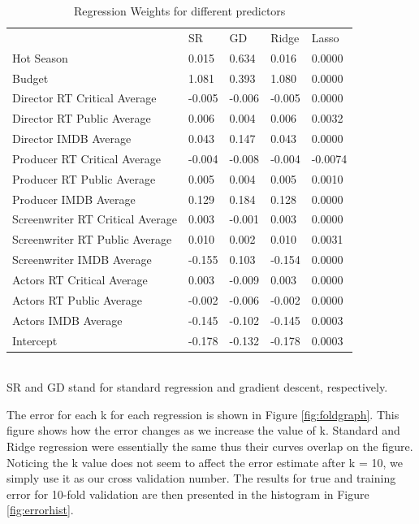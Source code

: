\documentclass[conference]{IEEEtran}
\begin{document}
\begin{table}[h]
\caption{Regression Weights for different predictors}
\label{table:regweights}
\begin{tabular}{lllll}
                                 &SR       & GD & Ridge  & Lasso\\
Hot Season                       & 0.015        & 0.634            & 0.016  & 0.0000  \\
Budget                           & 1.081        & 0.393            & 1.080  & 0.0000  \\
Director RT Critical Average     & -0.005       & -0.006           & -0.005 & 0.0000  \\
Director RT Public Average       & 0.006        & 0.004            & 0.006  & 0.0032  \\
Director IMDB Average            & 0.043        & 0.147            & 0.043  & 0.0000  \\
Producer RT Critical Average     & -0.004       & -0.008           & -0.004 & -0.0074 \\
Producer RT Public Average       & 0.005        & 0.004            & 0.005  & 0.0010  \\
Producer IMDB Average            & 0.129        & 0.184            & 0.128  & 0.0000  \\
Screenwriter RT Critical Average & 0.003        & -0.001           & 0.003  & 0.0000  \\
Screenwriter RT Public Average   & 0.010        & 0.002            & 0.010  & 0.0031  \\
Screenwriter IMDB Average        & -0.155       & 0.103            & -0.154 & 0.0000  \\
Actors RT Critical Average       & 0.003        & -0.009           & 0.003  & 0.0000  \\
Actors RT Public Average         & -0.002       & -0.006           & -0.002 & 0.0000  \\
Actors IMDB Average              & -0.145       & -0.102           & -0.145 & 0.0003  \\
Intercept                        & -0.178       & -0.132           & -0.178 & 0.0003 
\end{tabular}
\\
SR and GD stand for standard regression and gradient descent, respectively.
\end{table}

The error for each k for each regression is shown in Figure \ref{fig:foldgraph}. This figure shows how
the error changes as we increase the value of k. Standard and Ridge regression were essentially the same 
thus their curves overlap on the figure. Noticing the k value does 
not seem to affect the error estimate after k = 10, we simply use it as our cross validation
number. The results for true and training error for 10-fold validation are then presented in 
the histogram in Figure \ref{fig:errorhist}.
\end{document}
